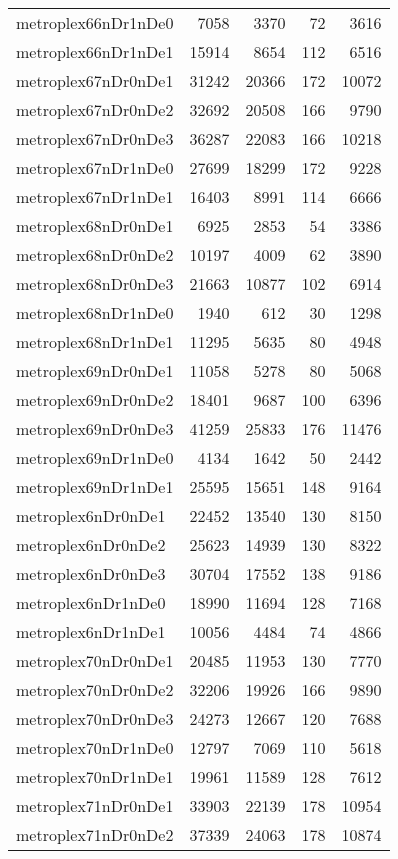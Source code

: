 \begin{longtable}{lrrrr}
metroplex66nDr1nDe0 & 7058 & 3370 & 72 & 3616 \\
metroplex66nDr1nDe1 & 15914 & 8654 & 112 & 6516 \\
metroplex67nDr0nDe1 & 31242 & 20366 & 172 & 10072 \\
metroplex67nDr0nDe2 & 32692 & 20508 & 166 & 9790 \\
metroplex67nDr0nDe3 & 36287 & 22083 & 166 & 10218 \\
metroplex67nDr1nDe0 & 27699 & 18299 & 172 & 9228 \\
metroplex67nDr1nDe1 & 16403 & 8991 & 114 & 6666 \\
metroplex68nDr0nDe1 & 6925 & 2853 & 54 & 3386 \\
metroplex68nDr0nDe2 & 10197 & 4009 & 62 & 3890 \\
metroplex68nDr0nDe3 & 21663 & 10877 & 102 & 6914 \\
metroplex68nDr1nDe0 & 1940 & 612 & 30 & 1298 \\
metroplex68nDr1nDe1 & 11295 & 5635 & 80 & 4948 \\
metroplex69nDr0nDe1 & 11058 & 5278 & 80 & 5068 \\
metroplex69nDr0nDe2 & 18401 & 9687 & 100 & 6396 \\
metroplex69nDr0nDe3 & 41259 & 25833 & 176 & 11476 \\
metroplex69nDr1nDe0 & 4134 & 1642 & 50 & 2442 \\
metroplex69nDr1nDe1 & 25595 & 15651 & 148 & 9164 \\
metroplex6nDr0nDe1 & 22452 & 13540 & 130 & 8150 \\
metroplex6nDr0nDe2 & 25623 & 14939 & 130 & 8322 \\
metroplex6nDr0nDe3 & 30704 & 17552 & 138 & 9186 \\
metroplex6nDr1nDe0 & 18990 & 11694 & 128 & 7168 \\
metroplex6nDr1nDe1 & 10056 & 4484 & 74 & 4866 \\
metroplex70nDr0nDe1 & 20485 & 11953 & 130 & 7770 \\
metroplex70nDr0nDe2 & 32206 & 19926 & 166 & 9890 \\
metroplex70nDr0nDe3 & 24273 & 12667 & 120 & 7688 \\
metroplex70nDr1nDe0 & 12797 & 7069 & 110 & 5618 \\
metroplex70nDr1nDe1 & 19961 & 11589 & 128 & 7612 \\
metroplex71nDr0nDe1 & 33903 & 22139 & 178 & 10954 \\
metroplex71nDr0nDe2 & 37339 & 24063 & 178 & 10874 \\

\end{longtable}
